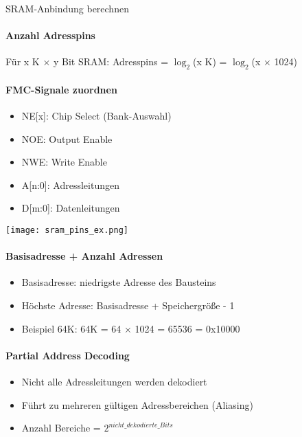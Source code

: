 \begin{concept}{SRAM-Anbindung berechnen}
    \paragraph{Anzahl Adresspins}
    Für x K $\times$ y Bit SRAM: Adresspins = $\log_2$(x K) = $\log_2$(x $\times$ 1024)

    \paragraph{FMC-Signale zuordnen}

    \begin{minipage}{0.65\linewidth}
    \begin{itemize}
        \item NE[x]: Chip Select (Bank-Auswahl)
        \item NOE: Output Enable
        \item NWE: Write Enable
        \item A[n:0]: Adressleitungen
        \item D[m:0]: Datenleitungen
    \end{itemize}
    \end{minipage}
    \begin{minipage}{0.3\linewidth}
    \texttt{[image: sram\_pins\_ex.png]}
    \end{minipage}
    


    \paragraph{Basisadresse + Anzahl Adressen}
    \begin{itemize}
        \item Basisadresse: niedrigste Adresse des Bausteins
        \item Höchste Adresse: Basisadresse + Speichergröße - 1
        \item Beispiel 64K: 64K = 64 $\times$ 1024 = 65536 = 0x10000
    \end{itemize}
    
    \paragraph{Partial Address Decoding}
    \begin{itemize}
        \item Nicht alle Adressleitungen werden dekodiert
        \item Führt zu mehreren gültigen Adressbereichen (Aliasing)
        \item Anzahl Bereiche = $2^{nicht\_dekodierte\_Bits}$
    \end{itemize}
    
    
\end{concept}




